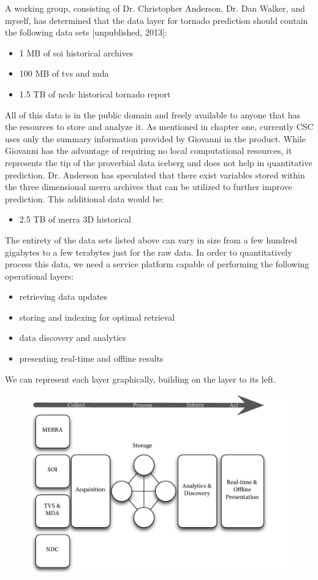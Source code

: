 A working group, consisting of Dr. Christopher Anderson, Dr. Dan Walker, and myself, has determined that the data layer for tornado prediction should contain the following data sets [unpublished, 2013]:
\begin{itemize}
    \item 1 MB of \gls{soi} historical archives \cite{bom}
    \item 100 MB of \gls{tvs} and \gls{mda} \cite{hdss}
    \item 1.5 TB of \gls{ncdc} historical tornado report \cite{ncdc}
\end{itemize}
All of this data is in the public domain and freely available to anyone that has the resources to store and analyze it. As mentioned in chapter one, currently CSC uses only the summary information provided by Giovanni in the \climatedge product. While Giovanni has the advantage of requiring no local computational resources, it represents the tip of the proverbial data iceberg and does not help in quantitative prediction. Dr. Anderson has speculated that there exist variables stored within the three dimensional \gls{merra} archives that can be utilized to further improve prediction. This additional data would be:
\begin{itemize}
    \item 2.5 TB of \gls{merra} 3D historical \cite{mdisc}
\end{itemize}
The entirety of the data sets listed above can vary in size from a few hundred gigabytes to a few terabytes just for the raw data. In order to quantitatively process this data, we need a service platform capable of performing the following operational layers:
\begin{itemize}
	\item retrieving data updates
	\item storing and indexing for optimal retrieval
	\item data discovery and analytics
	\item presenting real-time and offline results
\end{itemize}
We can represent each layer graphically, building on the layer to its left. 
\begin{figure}[htp]
    \centering
    \includegraphics[scale=.75]{dataflow}
\end{figure}

